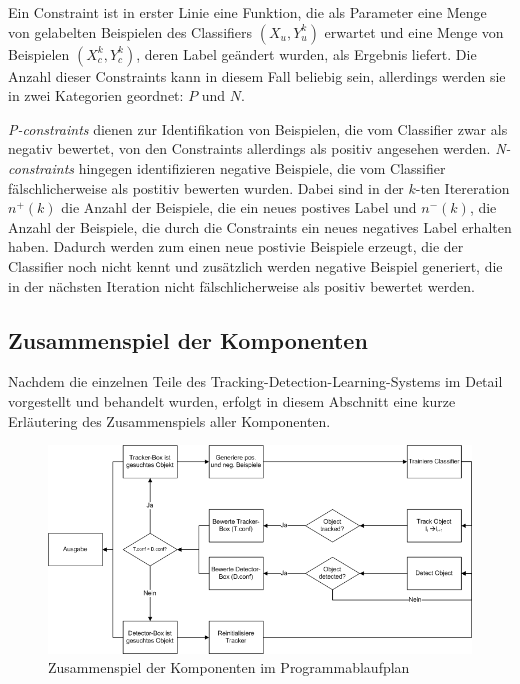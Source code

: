 	Ein Constraint ist in erster Linie eine Funktion, die als Parameter eine Menge von gelabelten Beispielen des Classifiers $(X_{u},Y_{u}^{k})$ erwartet und eine Menge von Beispielen $(X_{c}^{k},Y_{c}^{k})$, deren Label geändert wurden, als Ergebnis liefert. Die Anzahl dieser Constraints kann in diesem Fall beliebig sein, allerdings werden sie in zwei Kategorien geordnet: $P$ und $N$. 

	\textit{P-constraints} dienen zur Identifikation von Beispielen, die vom Classifier zwar als negativ bewertet, von den Constraints allerdings als positiv angesehen werden. \textit{N-constraints} hingegen identifizieren negative Beispiele, die vom Classifier fälschlicherweise als postitiv bewerten wurden. Dabei sind in der $k$-ten Itereration $n^{+}(k)$ die Anzahl der Beispiele, die ein neues postives Label und $n^{-}(k)$, die Anzahl der Beispiele, die durch die Constraints ein neues negatives Label erhalten haben. Dadurch werden zum einen neue postivie Beispiele erzeugt, die der Classifier noch nicht kennt und zusätzlich werden negative Beispiel generiert, die in der nächsten Iteration nicht fälschlicherweise als positiv bewertet werden. 

	\subsection{Zusammenspiel der Komponenten}
	Nachdem die einzelnen Teile des Tracking-Detection-Learning-Systems im Detail vorgestellt und behandelt wurden, erfolgt in diesem Abschnitt eine kurze Erläutering des Zusammenspiels aller Komponenten.

	\begin{figure}
	\includegraphics[scale=0.5]{../pictures/PAP.png}
	\caption{Zusammenspiel der Komponenten im Programmablaufplan}
	\label{abb:pap}
	\end{figure}

